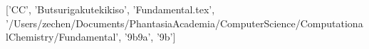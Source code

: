 ['CC', 'Butsurigakutekikiso', 'Fundamental.tex', '/Users/zechen/Documents/PhantasiaAcademia/ComputerScience/ComputationalChemistry/Fundamental', '\x9b\xbd{}\x9a\xbe\xae{}\xaf{}', '\x9b\xbd{}\xaf{}']
